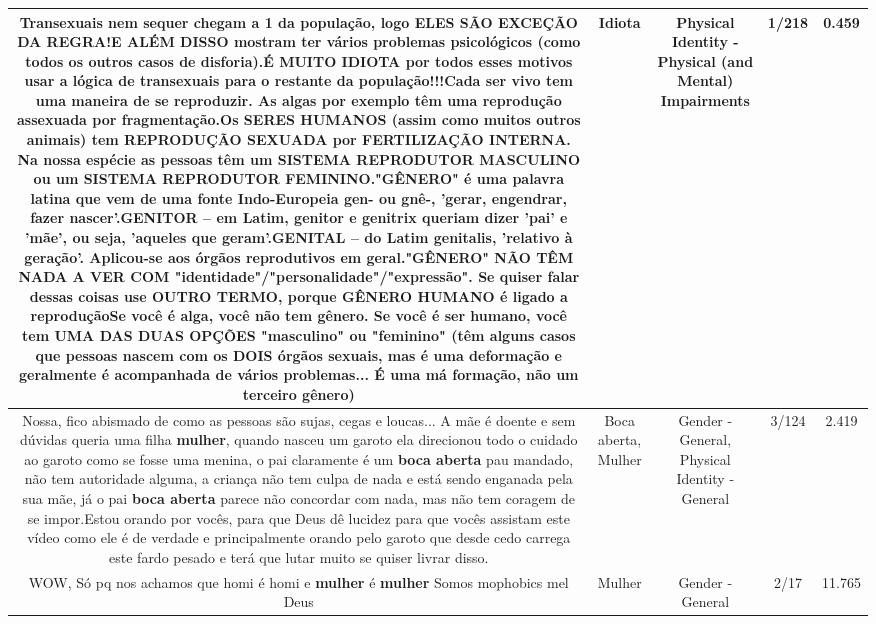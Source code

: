 \documentclass[11pt]{article}
\newlength\mylength
\begin{document}
\begin{center}
\begin{longtable}{|C{.65\mylength}|C{.30\mylength}|C{.12\mylength}|C{.12\mylength}|C{.12\mylength}|}
  \small Transexuais nem sequer chegam a 1 da população, logo ELES SÃO EXCEÇÃO DA REGRA!E ALÉM DISSO mostram ter vários problemas psicológicos (como todos os outros casos de disforia).É MUITO \textbf{IDIOTA} por todos esses motivos usar a lógica de transexuais para o restante da população!!!Cada ser vivo tem uma maneira de se reproduzir. As algas por exemplo têm uma reprodução assexuada por fragmentação.Os SERES HUMANOS (assim como muitos outros animais) tem REPRODUÇÃO SEXUADA por FERTILIZAÇÃO INTERNA. Na nossa espécie as pessoas têm um SISTEMA REPRODUTOR MASCULINO ou um SISTEMA REPRODUTOR FEMININO."GÊNERO" é uma palavra latina que vem de uma fonte Indo-Europeia gen- ou gnê-, 'gerar, engendrar, fazer nascer'.GENITOR – em Latim, genitor e genitrix queriam dizer 'pai' e 'mãe', ou seja, 'aqueles que geram'.GENITAL – do Latim genitalis, 'relativo à geração'.  Aplicou-se aos órgãos reprodutivos em geral."GÊNERO" NÃO TÊM NADA A VER COM "identidade"/"personalidade"/"expressão". Se quiser falar dessas coisas use OUTRO TERMO, porque GÊNERO HUMANO é ligado a reproduçãoSe você é alga, você não tem gênero. Se você é ser humano, você tem UMA DAS DUAS OPÇÕES "masculino" ou "feminino" (têm alguns casos que pessoas nascem com os DOIS órgãos sexuais, mas é uma deformação e geralmente é acompanhada de vários problemas... É uma má formação, não um terceiro gênero)\normalsize   & Idiota & Physical Identity - Physical (and Mental) Impairments & 1/218 & 0.459 \\  \hline
  \small Nossa, fico abismado de como as pessoas são sujas, cegas e loucas... A mãe é doente e sem dúvidas queria uma filha \textbf{mulher}, quando nasceu um garoto ela direcionou todo o cuidado ao garoto como se fosse uma menina, o pai claramente é um \textbf{boca aberta} pau mandado, não tem autoridade alguma, a criança não tem culpa de nada e está sendo enganada pela sua mãe, já o pai \textbf{boca aberta} parece não concordar com nada, mas não tem coragem de se impor.Estou orando por vocês, para que Deus dê lucidez para que vocês assistam este vídeo como ele é de verdade e principalmente orando pelo garoto que desde cedo carrega este fardo pesado e terá que lutar muito se quiser livrar disso.\normalsize   & Boca aberta, Mulher & Gender - General, Physical Identity - General & 3/124 & 2.419 \\  \hline
  \small WOW, Só pq nos achamos que homi é homi e \textbf{mulher} é \textbf{mulher} Somos mophobics mel Deus\normalsize   & Mulher & Gender - General & 2/17 & 11.765 \\  \hline

\end{longtable}
\end{center}
\end{document}
